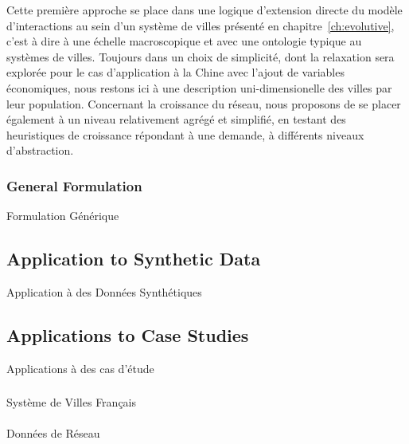 Cette première approche se place dans une logique d'extension directe du modèle d'interactions au sein d'un système de villes présenté en chapitre~\autoref{ch:evolutive}, c'est à dire à une échelle macroscopique et avec une ontologie typique au systèmes de villes. Toujours dans un choix de simplicité, dont la relaxation sera explorée pour le cas d'application à la Chine avec l'ajout de variables économiques, nous restons ici à une description uni-dimensionelle des villes par leur population. Concernant la croissance du réseau, nous proposons de se placer également à un niveau relativement agrégé et simplifié, en testant des heuristiques de croissance répondant à une demande, à différents niveaux d'abstraction. 







\subsubsection{General Formulation}{Formulation Générique}








\subsection{Application to Synthetic Data}{Application à des Données Synthétiques}






\subsection[Applications][Applications]{Applications to Case Studies}{Applications à des cas d'étude}


\subsubsection{}{Système de Villes Français}

\paragraph{}{Données de Réseau}

